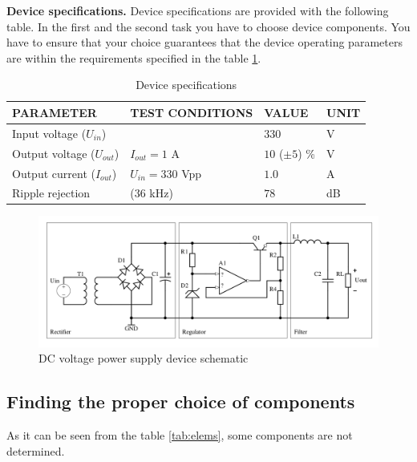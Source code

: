\documentclass[openany]{book}
\begin{document}
	\textbf{Device specifications.} Device specifications are provided with 
	the following table. In the first and the second task you have to choose 
	device 
	components. You have to ensure that your choice guarantees that the 
	device operating parameters are within the requirements specified in the 
	table \ref{tab:spec}.
	
	\begin{table}[h!]
		\caption{Device specifications}
		\label{tab:spec}
		\begin{tabularx}{\linewidth}{|X|X|X|X|} \hline
			PARAMETER & TEST CONDITIONS & VALUE & UNIT \\ \hline
			Input voltage ($U_{in}$)&  & $330$ & V \\ \hline 
			Output voltage ($U_{out}$)& $I_{out} = 1$ A & $10$ ($\pm5$) \% & V 
			\\ 
			\hline
			Output current ($I_{out}$) & $U_{in} = 330$ Vpp & $1.0$ & A \\ 
			\hline
			Ripple rejection & (36 kHz) & $78$ & dB \\ \hline
		\end{tabularx}
	\end{table}
	
	\begin{figure}
		\centering
		\includegraphics[width=\linewidth]{reg.png}
		\caption{DC voltage power supply device schematic}
		\label{fig:schematic}
	\end{figure}
	
	\clearpage
	
	\subsection{Finding the proper choice of components}
	\label{ele:task:1}
	As it can be seen from the table \ref{tab:elems}, some components are not 
	determined. 
	
\end{document}
